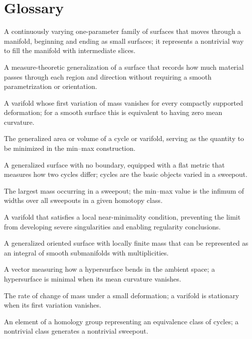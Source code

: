 \section*{Glossary}
\begin{description}[leftmargin=*,style=nextline,itemsep=0.3em]

\item[\textbf{Sweepout.}] A continuously varying one-parameter family of surfaces that moves through a manifold, beginning and ending as small surfaces; it represents a nontrivial way to fill the manifold with intermediate slices.

\item[\textbf{Varifold.}] A measure-theoretic generalization of a surface that records how much material passes through each region and direction without requiring a smooth parametrization or orientation.

\item[\textbf{Stationary varifold.}] A varifold whose first variation of mass vanishes for every compactly supported deformation; for a smooth surface this is equivalent to having zero mean curvature.

\item[\textbf{Mass.}] The generalized area or volume of a cycle or varifold, serving as the quantity to be minimized in the min--max construction.

\item[\textbf{Flat cycle.}] A generalized surface with no boundary, equipped with a flat metric that measures how two cycles differ; cycles are the basic objects varied in a sweepout.

\item[\textbf{Width.}] The largest mass occurring in a sweepout; the min--max value is the infimum of widths over all sweepouts in a given homotopy class.

\item[\textbf{Almost-minimizing varifold.}] A varifold that satisfies a local near-minimality condition, preventing the limit from developing severe singularities and enabling regularity conclusions.

\item[\textbf{Integral current.}] A generalized oriented surface with locally finite mass that can be represented as an integral of smooth submanifolds with multiplicities.

\item[\textbf{Mean curvature.}] A vector measuring how a hypersurface bends in the ambient space; a hypersurface is minimal when its mean curvature vanishes.

\item[\textbf{First variation.}] The rate of change of mass under a small deformation; a varifold is stationary when its first variation vanishes.

\item[\textbf{Homology class.}] An element of a homology group representing an equivalence class of cycles; a nontrivial class generates a nontrivial sweepout.

\end{description}

